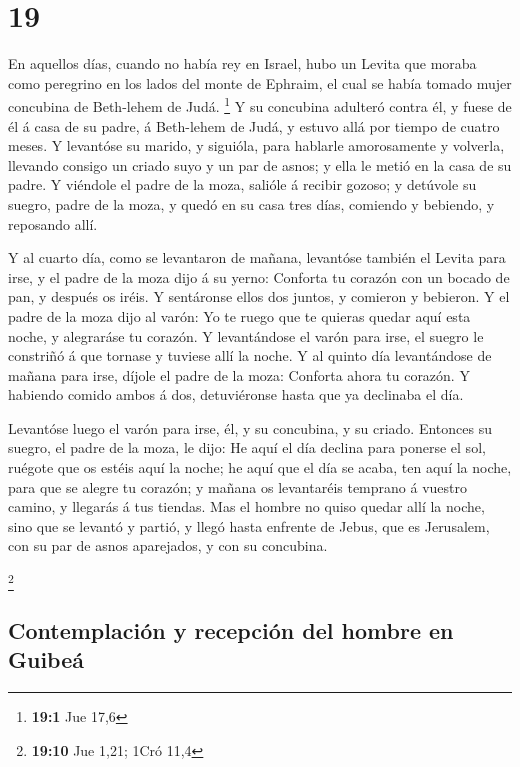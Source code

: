 \hypertarget{section-18}{%
\section{19}\label{section-18}}

 En aquellos días, cuando no había rey en Israel, hubo un
Levita que moraba como peregrino en los lados del monte de Ephraim, el
cual se había tomado mujer concubina de Beth-lehem de Judá. \footnote{\textbf{19:1}
  Jue 17,6}  Y su concubina adulteró contra él, y fuese de
él á casa de su padre, á Beth-lehem de Judá, y estuvo allá por tiempo de
cuatro meses.  Y levantóse su marido, y siguióla, para
hablarle amorosamente y volverla, llevando consigo un criado suyo y un
par de asnos; y ella le metió en la casa de su padre.  Y
viéndole el padre de la moza, salióle á recibir gozoso; y detúvole su
suegro, padre de la moza, y quedó en su casa tres días, comiendo y
bebiendo, y reposando allí.

 Y al cuarto día, como se levantaron de mañana, levantóse
también el Levita para irse, y el padre de la moza dijo á su yerno:
Conforta tu corazón con un bocado de pan, y después os iréis.
 Y sentáronse ellos dos juntos, y comieron y bebieron. Y
el padre de la moza dijo al varón: Yo te ruego que te quieras quedar
aquí esta noche, y alegraráse tu corazón.  Y levantándose
el varón para irse, el suegro le constriñó á que tornase y tuviese allí
la noche.  Y al quinto día levantándose de mañana para
irse, díjole el padre de la moza: Conforta ahora tu corazón. Y habiendo
comido ambos á dos, detuviéronse hasta que ya declinaba el día.

 Levantóse luego el varón para irse, él, y su concubina, y
su criado. Entonces su suegro, el padre de la moza, le dijo: He aquí el
día declina para ponerse el sol, ruégote que os estéis aquí la noche; he
aquí que el día se acaba, ten aquí la noche, para que se alegre tu
corazón; y mañana os levantaréis temprano á vuestro camino, y llegarás á
tus tiendas.  Mas el hombre no quiso quedar allí la
noche, sino que se levantó y partió, y llegó hasta enfrente de Jebus,
que es Jerusalem, con su par de asnos aparejados, y con su concubina.

\footnote{\textbf{19:10} Jue 1,21; 1Cró 11,4}

\hypertarget{contemplaciuxf3n-y-recepciuxf3n-del-hombre-en-guibeuxe1}{%
\subsection{Contemplación y recepción del hombre en
Guibeá}\label{contemplaciuxf3n-y-recepciuxf3n-del-hombre-en-guibeuxe1}}

